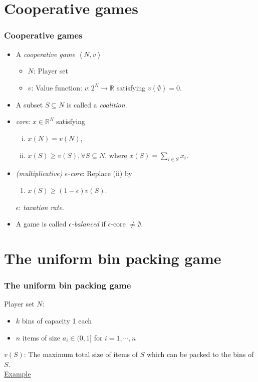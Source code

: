 \documentclass{beamer}
\begin{document}
\section{Cooperative games}

\begin{frame}\frametitle{Cooperative games}
  \begin{itemize}
    \item A \emph{cooperative game} $\left<N,v\right>$
      \begin{itemize}
        \item $N$: Player set
        \item $v$: Value function: $v:2^N \rightarrow \mathbb{R}$ satisfying $v(\emptyset)=0$.
      \end{itemize}
    \item<2-> A subset $S \subseteq N$ is called a \emph{coalition}.
    \item<3-> \emph{core}: $x \in \mathbb{R} ^N$ satisfying
    \begin{enumerate}[(i)]
    \item $x(N) = v(N)$,
    \item $x(S)\geq v(S), \forall S\subseteq N$, where $x(S)=\sum_{i\in S}{x_i}$.
    \end{enumerate}
    \item<4-> \emph{(multiplicative) $\epsilon$-core}: Replace (ii) by
      \begin{enumerate}[(ii')]
        \item $x(S)\geq (1-\epsilon)v(S)$.
      \end{enumerate}
      $\epsilon$: \emph{taxation rate}.
    \item<5-> A game is called \emph{$\epsilon$-balanced} if $\epsilon$-core $\neq\emptyset$.
\end{itemize}
\end{frame}

\section{The uniform bin packing game}

\begin{frame}\frametitle{The uniform bin packing game}
  Player set $N$:
  \begin{itemize}
    \item<1-> $k$ bins of capacity 1 each
    \item<2-> $n$ items of size $a_i\in (0,1]$ for $i=1,\cdots,n$
  \end{itemize}
  \pause[3]
  $v(S)$: The maximum total size of items of $S$ which can be packed to the bins of $S$.
  \pause[4]
  \\[10pt]
  \underline{Example}
  \\[10pt]
  
\end{frame}
\end{document}
